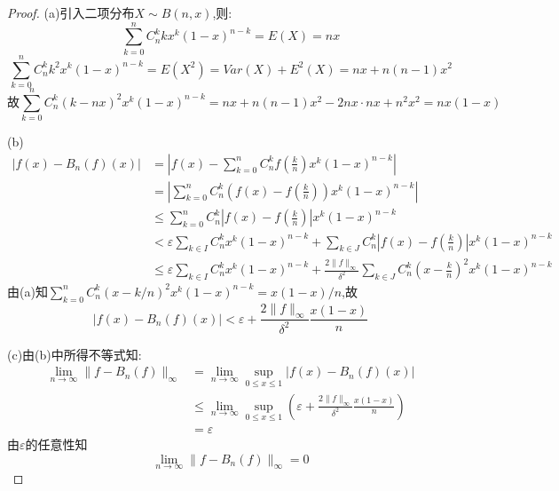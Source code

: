 \begin{proof}
(a)引入二项分布$X\sim B(n,x)$,则:
\[\sum_{k=0}^nC_n^kkx^k(1-x)^{n-k}=E(X)=nx\]
\[\sum_{k=0}^nC_n^kk^2x^k(1-x)^{n-k}=E(X^2)=Var(X)+E^2(X)=nx+n(n-1)x^2\]
\[\mbox{故}\sum_{k=0}^nC_n^k(k-nx)^2x^k(1-x)^{n-k}=nx+n(n-1)x^2-2nx\cdot nx+n^2x^2=nx(1-x)\]

(b)\[\begin{split}
|f(x)-B_n(f)(x)|&=\left|f(x)-\sum_{k=0}^nC_n^kf\left(\frac{k}{n}\right)x^k(1-x)^{n-k}\right|\\
&=\left|\sum_{k=0}^nC_n^k\left(f(x)-f\left(\frac{k}{n}\right)\right)x^k(1-x)^{n-k}\right|\\
&\leq\sum_{k=0}^nC_n^k\left|f(x)-f\left(\frac{k}{n}\right)\right|x^k(1-x)^{n-k}\\
&<\varepsilon\sum_{k\in I}C_n^kx^k(1-x)^{n-k}+\sum_{k\in J}C_n^k\left|f(x)-f\left(\frac{k}{n}\right)\right|x^k(1-x)^{n-k}\\
&\leq\varepsilon\sum_{k\in I}C_n^kx^k(1-x)^{n-k}+\frac{2\|f\|_{\infty}}{\delta^2}\sum_{k\in J}C_n^k\left(x-\frac{k}{n}\right)^2x^k(1-x)^{n-k}
\end{split}\]
由(a)知$\sum_{k=0}^nC_n^k(x-k/n)^2x^k(1-x)^{n-k}=x(1-x)/n$,故
\[|f(x)-B_n(f)(x)|<\varepsilon+\frac{2\|f\|_{\infty}}{\delta^2}\frac{x(1-x)}{n}\]

(c)由(b)中所得不等式知:
\[\begin{split}\lim_{n\to\infty}\|f-B_n(f)\|_{\infty}
&=\lim_{n\to\infty}\sup\limits_{0\leq x\leq 1}|f(x)-B_n(f)(x)|\\
&\leq\lim_{n\to\infty}\sup\limits_{0\leq x\leq 1}\left(\varepsilon+\frac{2\|f\|_{\infty}}{\delta^2}\frac{x(1-x)}{n}\right)\\&=\varepsilon\end{split}\]
由$\varepsilon$的任意性知\[\lim_{n\to\infty}\|f-B_n(f)\|_{\infty}=0\]
\end{proof}


